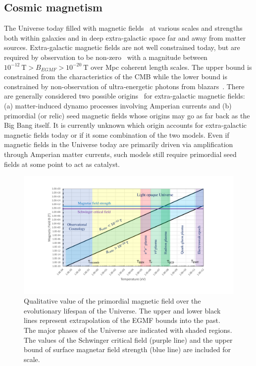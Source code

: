 \documentclass[universe,article,submit,moreauthors,pdftex,a4paper]{Definitions/mdpi}
\begin{document}
\subsection{Cosmic magnetism}\label{sec:Energy}
\noindent The Universe today filled with magnetic fields~\cite{Kronberg:1993vk} at various scales and strengths both within galaxies and in deep extra-galactic space far and away from matter sources. Extra-galactic magnetic fields are not well constrained today, but are required by observation to be non-zero~\cite{Anchordoqui:2001bs,Widrow:2002ud} with a magnitude between $10^{-12}\ \mathrm{T}>B_{EGMF}>10^{-20}\ \mathrm{T}$ over Mpc coherent length scales. The upper bound is constrained from the characteristics of the CMB while the lower bound is constrained by non-observation of ultra-energetic photons from blazars~\cite{Neronov:2010gir}. There are generally considered two possible origins~\cite{Widrow:2011hs,Vazza:2021vwy} for extra-galactic magnetic fields: (a) matter-induced dynamo processes involving Amperian currents and (b) primordial (or relic) seed magnetic fields whose origins may go as far back as the Big Bang itself. It is currently unknown which origin accounts for extra-galactic magnetic fields today or if it some combination of the two models. Even if magnetic fields in the Universe today are primarily driven via amplification through Amperian matter currents, such models still require primordial seed fields at some point to act as catalyst.

\begin{figure}[htbp]
 \centering \includegraphics[trim=110 50 120 40,clip,width=\textwidth]{./plots/relic_plot.pdf}
 \caption{Qualitative value of the primordial magnetic field over the evolutionary lifespan of the Universe. The upper and lower black lines represent extrapolation of the EGMF bounds into the past. The major phases of the Universe are indicated with shaded regions. The values of the Schwinger critical field (purple line) and the upper bound of surface magnetar field strength (blue line) are included for scale.\label{relic_plot}}
\end{figure}
\end{document}
